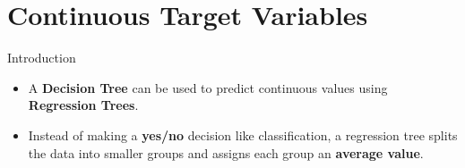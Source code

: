 \documentclass[11pt]{beamer}
\begin{document}
\section{Continuous Target Variables}
%
%
\begin{frame}{Introduction}
    \begin{itemize}
        \item A \textbf{Decision Tree} can be used to predict continuous values using \textbf{Regression Trees}.
        \item Instead of making a \textbf{yes/no} decision like classification, a regression tree splits the data into smaller groups and assigns each group an \textbf{average value}.
    \end{itemize}
\end{frame}
\end{document}
